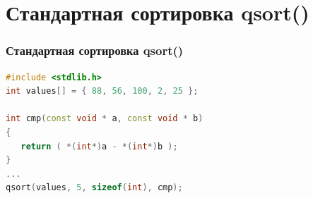 \documentclass[12pt,pdf,hyperref={unicode}]{beamer}
\begin{document}


\section{Стандартная сортировка qsort()}


\begin{frame}[fragile]
\frametitle{Стандартная сортировка qsort()} 
\begin{lstlisting}[language=C++,basicstyle=\ttfamily,keywordstyle=\color{blue}]
#include <stdlib.h>
int values[] = { 88, 56, 100, 2, 25 };

int cmp(const void * a, const void * b)
{
   return ( *(int*)a - *(int*)b );
}
...
qsort(values, 5, sizeof(int), cmp);

\end{lstlisting}
\end{frame}
\end{document}

